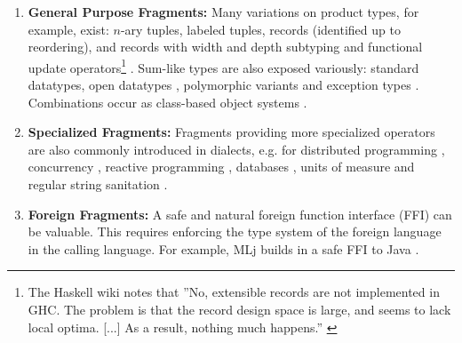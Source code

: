 \documentclass[pldi]{sigplanconf-pldi15}
\begin{document}
\begin{enumerate}
\vspace{-5px}
\item 
\textbf{General Purpose Fragments:} 
Many variations on product types, for example, exist: 
$n$-ary tuples, 
labeled tuples, 
records (identified up to reordering), and 
records with width and depth subtyping \cite{Cardelli:1984:SMI:1096.1098} and functional update operators\footnote{The Haskell wiki notes that ''No, extensible records are not implemented in GHC. The problem is that the record design space is large, and seems to lack local optima. [...] As a result, nothing much happens.'' \cite{GHCFAQ}} \cite{ocaml-manual}%
. 
 Sum-like types are also exposed variously: standard datatypes, 
open datatypes \cite{conf/ppdp/LohH06,journals/toplas/MillsteinBC04}, 
polymorphic variants \cite{ocaml-manual} and 
exception types \cite{Tofte:89:TheDefinitionOfStandardML}. Combinations occur as class-based object systems \cite{ocaml-manual}. 

\item
\textbf{Specialized Fragments:} Fragments providing more specialized operators are also commonly introduced in dialects, e.g. for distributed programming \cite{Murphy:2007:TDP:1793574.1793585}, concurrency \cite{AliceLookingGlass}, reactive programming \cite{mandel2005reactiveml}, databases \cite{Ohori:2011:MSM:2034773.2034815},  units of measure \cite{conf/cefp/Kennedy09} and regular string sanitation \cite{sanitation-psp14}.%
\vspace{-3px}
\item
\textbf{Foreign Fragments:} A safe and natural foreign function interface (FFI) can be valuable. This requires enforcing the type system of the foreign language in the calling language. %
For example, MLj builds in a safe FFI to Java \cite{Benton:1999:IWW:317636.317791}.
\end{enumerate}
\vspace{-5px}
\end{document}
